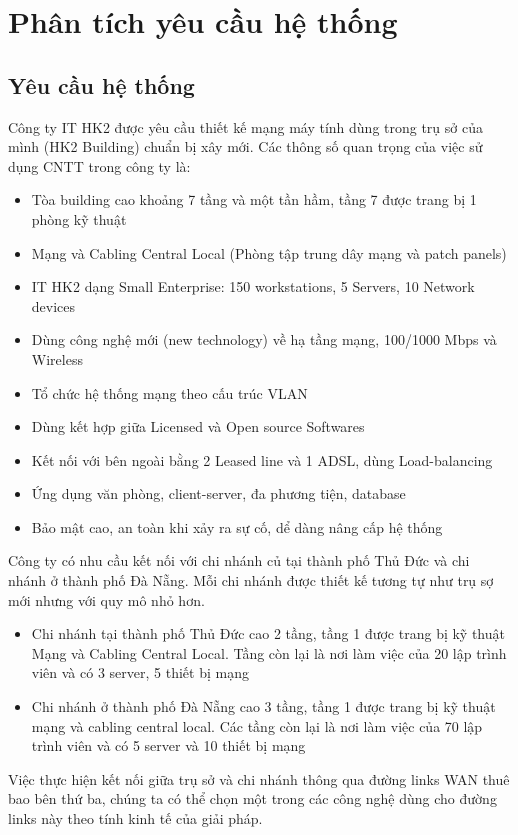 \documentclass[a4paper]{article}
\begin{document}
\newpage

\tableofcontents
\newpage

\section{Phân tích yêu cầu hệ thống}
\subsection{Yêu cầu hệ thống}
Công ty IT HK2 được yêu cầu thiết kế mạng máy tính dùng trong trụ sở của mình (HK2 Building) chuẩn bị xây mới. Các thông số quan trọng của việc sử dụng CNTT trong công ty là:
\begin{itemize}
    \item Tòa building cao khoảng 7 tầng và một tần hầm, tầng 7 được trang bị 1 phòng kỹ thuật
    \item Mạng và Cabling Central Local (Phòng tập trung dây mạng và patch panels)
    \item IT HK2 dạng Small Enterprise: 150 workstations, 5 Servers, 10 Network devices
    \item Dùng công nghệ mới (new technology) về hạ tầng mạng, 100/1000 Mbps và Wireless
    \item Tổ chức hệ thống mạng theo cấu trúc VLAN
    \item Dùng kết hợp giữa Licensed và Open source Softwares
    \item Kết nối với bên ngoài bằng 2 Leased line và 1 ADSL, dùng Load-balancing
    \item Ứng dụng văn phòng, client-server, đa phương tiện, database
    \item Bảo mật cao, an toàn khi xảy ra sự cố, dể dàng nâng cấp hệ thống
\end{itemize}
Công ty có nhu cầu kết nối với chi nhánh củ tại thành phố Thủ Đức và chi nhánh ở thành phố Đà Nẵng. Mỗi chi nhánh được thiết kế tương tự như trụ sợ mới nhưng với quy mô nhỏ hơn.
\begin{itemize}
    \item Chi nhánh tại thành phố Thủ Đức cao 2 tầng, tầng 1 được trang bị kỹ thuật Mạng và Cabling Central Local. Tầng còn lại là nơi làm việc của 20 lập trình viên và có 3 server, 5 thiết bị mạng
    \item Chi nhánh ở thành phố Đà Nẵng cao 3 tầng, tầng 1 được trang bị kỹ thuật mạng và cabling central local. Các tầng còn lại là nơi làm việc của 70 lập trình viên và có 5 server và 10 thiết bị mạng
\end{itemize}
Việc thực hiện kết nối giữa trụ sở và chi nhánh thông qua đường links WAN thuê bao bên thứ ba, chúng ta có thể chọn một trong các công nghệ dùng cho đường links này theo tính kinh tế của giải pháp.
\end{document}
